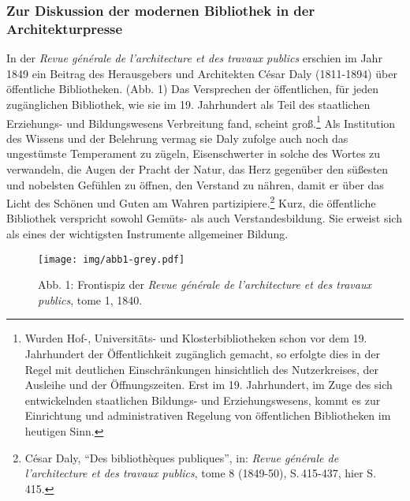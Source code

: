 \subsubsection{Zur Diskussion der modernen Bibliothek in der
Architekturpresse}\label{zur-diskussion-der-modernen-bibliothek-in-der-architekturpresse}

In der \emph{Revue générale de l'architecture et des travaux publics}
erschien im Jahr 1849 ein Beitrag des Herausgebers und Architekten César
Daly (1811-1894) über öffentliche Bibliotheken. (Abb. 1) Das Versprechen
der öffentlichen, für jeden zugänglichen Bibliothek, wie sie im 19.
Jahrhundert als Teil des staatlichen Erziehungs- und Bildungswesens
Verbreitung fand, scheint groß.\footnote{Wurden Hof-, Universitäts- und
  Klosterbibliotheken schon vor dem 19. Jahrhundert der Öffentlichkeit
  zugänglich gemacht, so erfolgte dies in der Regel mit deutlichen
  Einschränkungen hinsichtlich des Nutzerkreises, der Ausleihe und der
  Öffnungszeiten. Erst im 19. Jahrhundert, im Zuge des sich
  entwickelnden staatlichen Bildungs- und Erziehungswesens, kommt es zur
  Einrichtung und administrativen Regelung von öffentlichen Bibliotheken
  im heutigen Sinn.} Als Institution des Wissens und der Belehrung
vermag sie Daly zufolge auch noch das ungestümste Temperament zu zügeln,
Eisenschwerter in solche des Wortes zu verwandeln, die Augen der Pracht
der Natur, das Herz gegenüber den süßesten und nobelsten Gefühlen zu
öffnen, den Verstand zu nähren, damit er über das Licht des Schönen und
Guten am Wahren partizipiere.\footnote{César Daly, \enquote{Des
  bibliothèques publiques}, in: \emph{Revue générale de l'architecture
  et des travaux publics}, tome 8 (1849-50), S.\,415-437, hier S.\,415.}
Kurz, die öffentliche Bibliothek verspricht sowohl Gemüts- als auch
Verstandesbildung. Sie erweist sich als eines der wichtigsten
Instrumente allgemeiner Bildung.

\begin{figure}[htbp]
\centering
\texttt{[image: img/abb1-grey.pdf]}
\caption*{Abb. 1: Frontispiz der \emph{Revue générale de l'architecture et
des travaux publics}, tome 1, 1840.}
\end{figure}

